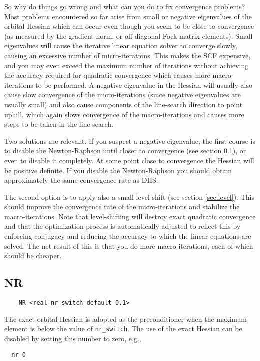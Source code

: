   So why do things go wrong and what can you do to fix convergence
problems?  Most problems encountered so far arise from small or
negative eigenvalues of the orbital Hessian which can occur even
though you seem to be close to convergence (as measured by the
gradient norm, or off diagonal Fock matrix elements).  Small
eigenvalues will cause the iterative linear equation solver to
converge slowly, causing an excessive number of micro-iterations.
This makes the SCF expensive, and you may even exceed the maximum
number of iterations without achieving the accuracy required for
quadratic convergence which causes more macro-iterations to be
performed.  A negative eigenvalue in the Hessian will usually also
cause slow convergence of the micro-iterations (since negative
eigenvalues are usually small) and also cause components of the
line-search direction to point uphill, which again slows convergence
of the macro-iterations and causes more steps to be taken in the line
search.

  Two solutions are relevant. If you suspect a negative eigenvalue,
the first course is to disable the Newton-Raphson until closer to
convergence (see section \ref{sec:nrswitch}), or even to disable it
completely.  At some point close to convergence the Hessian will be
positive definite.  If you disable the Newton-Raphson you should
obtain approximately the same convergence rate as DIIS.  

The second option is to apply also a small level-shift (see section
\ref{sec:level}).  This should improve the convergence rate of the
micro-iterations and stabilize the macro-iterations.  Note that
level-shifting will destroy exact quadratic convergence and that the
optimization process is automatically adjusted to reflect this by
enforcing conjugacy and reducing the accuracy to which the linear
equations are solved.  The net result of this is that you do more
macro iterations, each of which should be cheaper.

\subsection{NR}
\label{sec:nrswitch}

\begin{verbatim}
    NR <real nr_switch default 0.1>
\end{verbatim}

The exact orbital Hessian is adopted as the preconditioner
when the maximum element is below the value of \verb+nr_switch+.  The
use of the exact Hessian can be disabled by setting this number to
zero, e.g.,
\begin{verbatim}
  nr 0
\end{verbatim}


